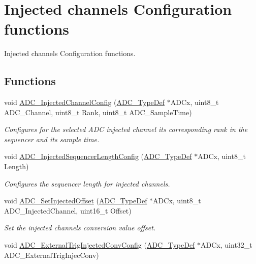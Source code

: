 \hypertarget{group___a_d_c___group6}{}\section{Injected channels Configuration functions}
\label{group___a_d_c___group6}


Injected channels Configuration functions.  


\subsection*{Functions}
\begin{DoxyCompactItemize}
\item 
void \hyperlink{group___a_d_c___group6_gae2b44bff080184e1cf6f2cb6b9bb3e59}{A\+D\+C\+\_\+\+Injected\+Channel\+Config} (\hyperlink{struct_a_d_c___type_def}{A\+D\+C\+\_\+\+Type\+Def} $\ast$A\+D\+Cx, uint8\+\_\+t A\+D\+C\+\_\+\+Channel, uint8\+\_\+t Rank, uint8\+\_\+t A\+D\+C\+\_\+\+Sample\+Time)
\begin{DoxyCompactList}\small\item\em Configures for the selected A\+DC injected channel its corresponding rank in the sequencer and its sample time. \end{DoxyCompactList}\item 
void \hyperlink{group___a_d_c___group6_ga24eba90bc3ee955e07659a605011710d}{A\+D\+C\+\_\+\+Injected\+Sequencer\+Length\+Config} (\hyperlink{struct_a_d_c___type_def}{A\+D\+C\+\_\+\+Type\+Def} $\ast$A\+D\+Cx, uint8\+\_\+t Length)
\begin{DoxyCompactList}\small\item\em Configures the sequencer length for injected channels. \end{DoxyCompactList}\item 
void \hyperlink{group___a_d_c___group6_ga07a942613088ab3ecfc3d97a20475920}{A\+D\+C\+\_\+\+Set\+Injected\+Offset} (\hyperlink{struct_a_d_c___type_def}{A\+D\+C\+\_\+\+Type\+Def} $\ast$A\+D\+Cx, uint8\+\_\+t A\+D\+C\+\_\+\+Injected\+Channel, uint16\+\_\+t Offset)
\begin{DoxyCompactList}\small\item\em Set the injected channels conversion value offset. \end{DoxyCompactList}\item 
void \hyperlink{group___a_d_c___group6_gafc02ce1e84e96b692adf085f61a0bca6}{A\+D\+C\+\_\+\+External\+Trig\+Injected\+Conv\+Config} (\hyperlink{struct_a_d_c___type_def}{A\+D\+C\+\_\+\+Type\+Def} $\ast$A\+D\+Cx, uint32\+\_\+t A\+D\+C\+\_\+\+External\+Trig\+Injec\+Conv)

\end{DoxyCompactItemize}

